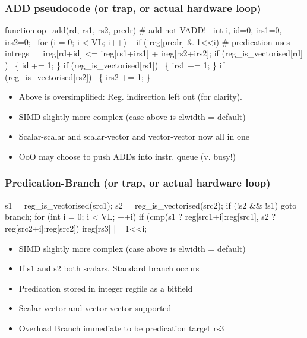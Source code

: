 \documentclass[slidestop]{beamer}
\begin{document}
\begin{frame}[fragile]
\frametitle{ADD pseudocode (or trap, or actual hardware loop)}

\begin{semiverbatim}
function op\_add(rd, rs1, rs2, predr) # add not VADD!
  int i, id=0, irs1=0, irs2=0;
  for (i = 0; i < VL; i++)
    if (ireg[predr] & 1<<i) # predication uses intregs
       ireg[rd+id] <= ireg[rs1+irs1] + ireg[rs2+irs2];
    if (reg\_is\_vectorised[rd] )  \{ id += 1; \}
    if (reg\_is\_vectorised[rs1])  \{ irs1 += 1; \}
    if (reg\_is\_vectorised[rs2])  \{ irs2 += 1; \}
\end{semiverbatim}

  \begin{itemize}
   \item Above is oversimplified: Reg. indirection left out (for clarity).
   \item SIMD slightly more complex (case above is elwidth = default)
   \item Scalar-scalar and scalar-vector and vector-vector now all in one
   \item OoO may choose to push ADDs into instr. queue (v. busy!)
  \end{itemize}
\end{frame}



\begin{frame}[fragile]
\frametitle{Predication-Branch (or trap, or actual hardware loop)}

\begin{semiverbatim}
s1 = reg\_is\_vectorised(src1);
s2 = reg\_is\_vectorised(src2);
if (!s2 && !s1) goto branch;
for (int i = 0; i < VL; ++i)
  if (cmp(s1 ? reg[src1+i]:reg[src1],
          s2 ? reg[src2+i]:reg[src2])
         ireg[rs3] |= 1<<i;
\end{semiverbatim}

  \begin{itemize}
   \item SIMD slightly more complex (case above is elwidth = default)  
   \item If s1 and s2 both scalars, Standard branch occurs
   \item Predication stored in integer regfile as a bitfield
   \item Scalar-vector and vector-vector supported
   \item Overload Branch immediate to be predication target rs3
  \end{itemize}
\end{frame}
\end{document}
